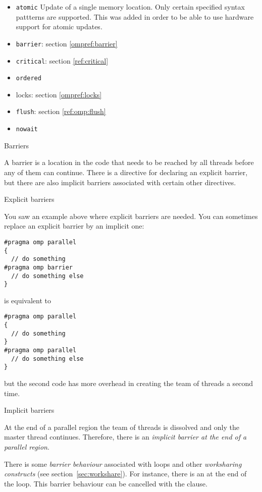 \begin{itemize}
\item \texttt{atomic} Update of a single memory location. Only certain
  specified syntax pattterns are supported. This was added in order to
  be able to use hardware support for atomic updates.
\item \texttt{barrier}: section \ref{ompref:barrier}
\item \texttt{critical}: section \ref{ref:critical}
\item \texttt{ordered}
\item locks: section \ref{ompref:locks}
\item \texttt{flush}: section \ref{ref:omp:flush}
\item \texttt{nowait}
\end{itemize}

 {Barriers}
\label{ompref:barrier}

A barrier is a location in the code that needs to be reached
by all threads before any of them can continue. There is 
a directive for declaring an explicit barrier, but 
there are also implicit barriers associated with certain other 
directives.

 {Explicit barriers}

You saw an example above where explicit barriers are needed.
You can sometimes replace an explicit barrier by an implicit one:
\begin{verbatim}
#pragma omp parallel
{
  // do something
#pragma omp barrier
  // do something else
}
\end{verbatim}
is equivalent to
\begin{verbatim}
#pragma omp parallel
{
  // do something
}
#pragma omp parallel
  // do something else
}
\end{verbatim}
but the second code has more overhead in creating the team of threads a second time.

 {Implicit barriers}

At the end of a parallel region the team of threads is dissolved and
only the master thread continues. Therefore, there is an
\emph{implicit barrier at the end of a parallel region}.

There is some \emph{barrier behaviour} associated with  loops and other
\emph{worksharing constructs} (see section~\ref{sec:workshare}).  For instance, there
is an  at the end of the loop. This
barrier behaviour can be cancelled with the 
clause.

